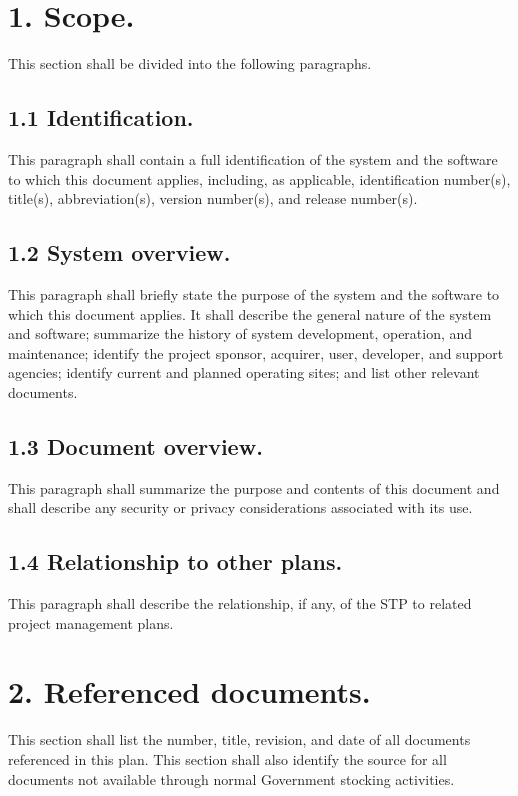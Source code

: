 \section{1. Scope.}

This section shall be divided into the following paragraphs.

\subsection{1.1 Identification.}

This paragraph shall contain a full identification of the system and the
software to which this document applies, including, as applicable,
identification number(s), title(s), abbreviation(s), version number(s),
and release number(s).

\subsection{1.2 System overview.}

This paragraph shall briefly state the purpose of the system and the
software to which this document applies. It shall describe the general
nature of the system and software; summarize the history of system
development, operation, and maintenance; identify the project sponsor,
acquirer, user, developer, and support agencies; identify current and
planned operating sites; and list other relevant documents.

\subsection{1.3 Document overview.}

This paragraph shall summarize the purpose and contents of this document
and shall describe any security or privacy considerations associated
with its use.

\subsection{1.4 Relationship to other plans.}

This paragraph shall describe the relationship, if any, of the STP to
related project management plans.

\section{2. Referenced documents.}

This section shall list the number, title, revision, and date of all
documents referenced in this plan. This section shall also identify the
source for all documents not available through normal Government
stocking activities.

